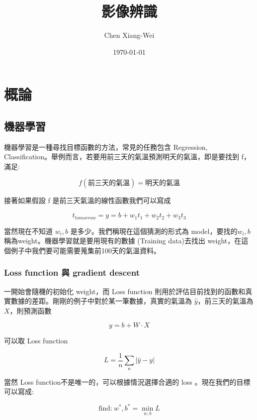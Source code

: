 \RaggedRight
\setlength{\parindent}{2em} %
\newpage

\title{影像辨識} %
\author{Chen Xiang-Wei} %

\date{\today}%
\date{\ROCtoday}%
\maketitle
\thispagestyle{fancy}
\raggedright
{}



\section{概論}

\subsection{機器學習}

機器學習是一種尋找目標函數的方法，常見的任務包含 Regression, Classification。舉例而言，若要用前三天的氣溫預測明天的氣溫，即是要找到 f，滿足: 

$$
f(\mbox{前三天的氣溫}) = \mbox{明天的氣溫}
$$

接著如果假設 f 是前三天氣溫的線性函數我們可以寫成

$$
t_{tomorrow}=y= b + w_1t_1+w_2t_2+w_3t_3
$$

當然現在不知道 $w_i, b$ 是多少。我們稱現在這個猜測的形式為 model，要找的$w_i, b$ 稱為weight。機器學習就是要用現有的數據 (Training data)去找出 weight，在這個例子中我們要可能需要蒐集前100天的氣溫資料。

\subsubsection*{Loss function 與 gradient descent}
一開始會隨機的初始化 weight，而 Loss function 則用於評估目前找到的函數和真實數據的差距。剛剛的例子中對於某一筆數據，真實的氣溫為 $\hat{y}$，前三天的氣溫為$X$，則預測函數 

$$
y= b + W\cdot X
$$
 
可以取 Loss function

$$
L = \frac{1}{n}\sum_{n} |\hat{y}-y|
$$

當然 Loss function不是唯一的，可以根據情況選擇合適的 loss 。現在我們的目標可以寫成:

$$
\mbox{find:}\ w^*, b^* = \min_{w,b} L
$$

